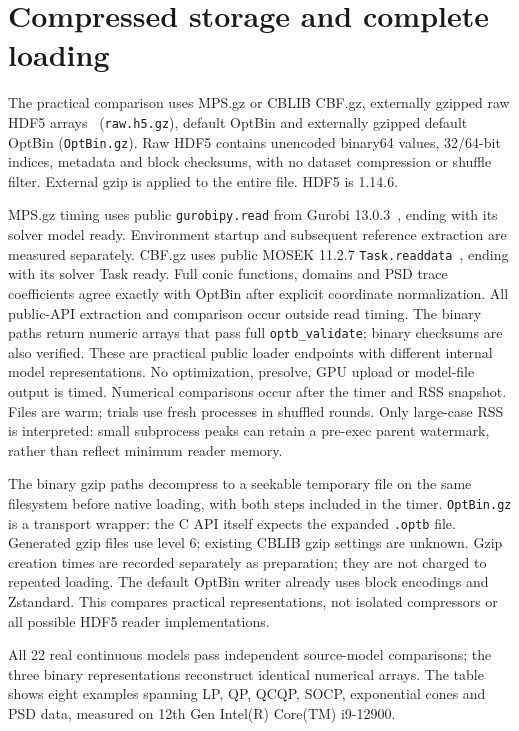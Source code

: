 \documentclass[10pt]{article}
\begin{document}
\clearpage
\section{Compressed storage and complete loading}
The practical comparison uses MPS.gz or CBLIB CBF.gz, externally gzipped raw
HDF5 arrays~\cite{hdf5} (\texttt{raw.h5.gz}), default OptBin and externally gzipped default
OptBin (\texttt{OptBin.gz}). Raw HDF5 contains unencoded binary64 values,
32/64-bit indices, metadata and block checksums, with no dataset compression or
shuffle filter. External gzip is applied to the entire file. HDF5 is 1.14.6.

MPS.gz timing uses public \texttt{gurobipy.read} from Gurobi 13.0.3~\cite{gurobiread},
ending with its solver model ready. Environment startup and subsequent
reference extraction are measured separately. CBF.gz uses public MOSEK 11.2.7
\texttt{Task.readdata}~\cite{mosekread}, ending with its solver Task ready.
Full conic functions, domains and PSD trace coefficients agree exactly with
OptBin after explicit coordinate normalization. All public-API extraction and
comparison occur outside read timing. The binary paths return numeric arrays
that pass full \texttt{optb\_validate}; binary checksums are also verified.
These are practical public loader endpoints with different internal model
representations. No optimization, presolve, GPU upload or model-file output is
timed. Numerical comparisons occur after the timer and RSS snapshot.
Files are warm; trials use fresh processes in shuffled rounds.
Only large-case RSS is interpreted: small subprocess peaks can retain a
pre-exec parent watermark, rather than reflect minimum reader memory.

The binary gzip paths decompress to a seekable temporary file on the same
filesystem before native loading, with both steps included in the timer.
\texttt{OptBin.gz} is a transport wrapper: the C API itself expects the expanded
\texttt{.optb} file. Generated gzip files use level 6; existing CBLIB gzip settings are unknown.
Gzip creation times are recorded separately as preparation;
they are not charged to repeated loading. The default OptBin writer already
uses block encodings and Zstandard. This compares practical representations,
not isolated compressors or all possible HDF5 reader implementations.

All 22 real continuous models pass independent source-model comparisons; the three binary representations reconstruct identical numerical arrays. The table shows eight examples spanning LP, QP, QCQP, SOCP, exponential cones and PSD data, measured on 12th Gen Intel(R) Core(TM) i9-12900.
\end{document}

